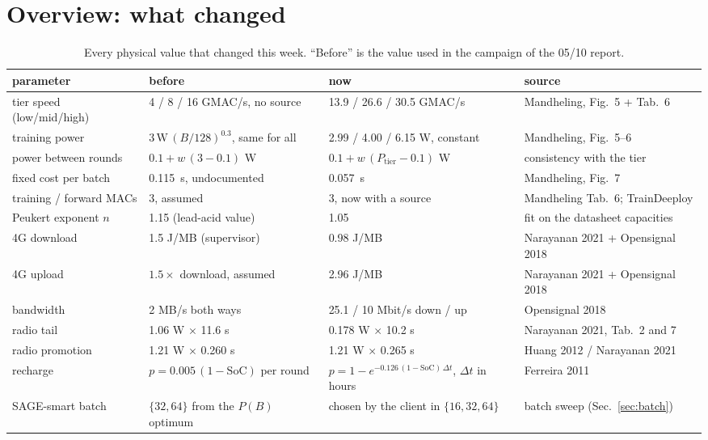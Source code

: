 \documentclass[11pt,a4paper]{article}
\begin{document}
\section{Overview: what changed}

\begin{table}[H]
\centering
\small
\caption{Every physical value that changed this week. ``Before'' is the
value used in the campaign of the 05/10 report.}
\label{tab:overview}
\begin{tabular}{p{3.4cm}p{3.2cm}p{3.6cm}p{4.2cm}}
\toprule
parameter & before & now & source \\
\midrule
tier speed (low/mid/high) & 4 / 8 / 16 GMAC/s, no source & 13.9 / 26.6 / 30.5 GMAC/s & Mandheling, Fig.~5 + Tab.~6 \\
training power & $3\,\mathrm{W}\,(B/128)^{0.3}$, same for all & 2.99 / 4.00 / 6.15 W, constant & Mandheling, Fig.~5--6 \\
power between rounds & $0.1 + w\,(3 - 0.1)$ W & $0.1 + w\,(P_\text{tier} - 0.1)$ W & consistency with the tier \\
fixed cost per batch & \SI{0.115}{\second}, undocumented & \SI{0.057}{\second} & Mandheling, Fig.~7 \\
training / forward MACs & 3, assumed & 3, now with a source & Mandheling Tab.~6; TrainDeeploy \\
Peukert exponent $n$ & 1.15 (lead-acid value) & 1.05 & fit on the datasheet capacities \\
4G download & 1.5 J/MB (supervisor) & 0.98 J/MB & Narayanan 2021 + Opensignal 2018 \\
4G upload & $1.5\times$ download, assumed & 2.96 J/MB & Narayanan 2021 + Opensignal 2018 \\
bandwidth & 2 MB/s both ways & 25.1 / 10 Mbit/s down / up & Opensignal 2018 \\
radio tail & 1.06 W $\times$ 11.6 s & 0.178 W $\times$ 10.2 s & Narayanan 2021, Tab.~2 and 7 \\
radio promotion & 1.21 W $\times$ 0.260 s & 1.21 W $\times$ 0.265 s & Huang 2012 / Narayanan 2021 \\
recharge & $p=0.005\,(1-\mathrm{SoC})$ per round & $p=1-e^{-0.126\,(1-\mathrm{SoC})\,\Delta t}$, $\Delta t$ in hours & Ferreira 2011 \\
SAGE-smart batch & $\{32, 64\}$ from the $P(B)$ optimum & chosen by the client in $\{16, 32, 64\}$ & batch sweep (Sec.~\ref{sec:batch}) \\
\bottomrule
\end{tabular}
\end{table}
\end{document}
